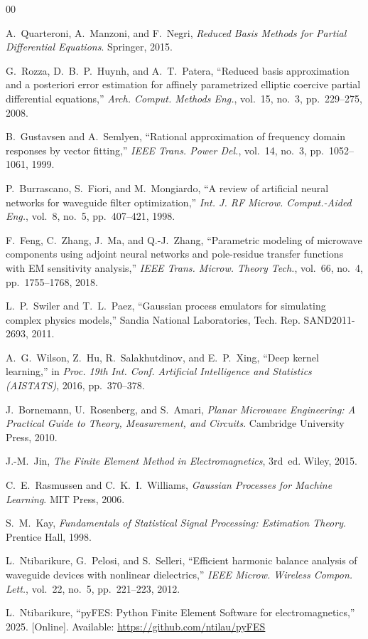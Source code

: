 \documentclass[conference]{IEEEtran}
\begin{document}
\begin{thebibliography}{00}

A.~Quarteroni, A.~Manzoni, and F.~Negri, \textit{Reduced Basis Methods for Partial Differential Equations}. Springer, 2015.

G.~Rozza, D.~B.~P.~Huynh, and A.~T.~Patera, ``Reduced basis approximation and a posteriori error estimation for affinely parametrized elliptic coercive partial differential equations,'' \textit{Arch. Comput. Methods Eng.}, vol.~15, no.~3, pp.~229--275, 2008.

B.~Gustavsen and A.~Semlyen, ``Rational approximation of frequency domain responses by vector fitting,'' \textit{IEEE Trans. Power Del.}, vol.~14, no.~3, pp.~1052--1061, 1999.

P.~Burrascano, S.~Fiori, and M.~Mongiardo, ``A review of artificial neural networks for waveguide filter optimization,'' \textit{Int. J. RF Microw. Comput.-Aided Eng.}, vol.~8, no.~5, pp.~407--421, 1998.

F.~Feng, C.~Zhang, J.~Ma, and Q.-J.~Zhang, ``Parametric modeling of microwave components using adjoint neural networks and pole-residue transfer functions with EM sensitivity analysis,'' \textit{IEEE Trans. Microw. Theory Tech.}, vol.~66, no.~4, pp.~1755--1768, 2018.

L.~P.~Swiler and T.~L.~Paez, ``Gaussian process emulators for simulating complex physics models,'' Sandia National Laboratories, Tech. Rep. SAND2011-2693, 2011.

A.~G.~Wilson, Z.~Hu, R.~Salakhutdinov, and E.~P.~Xing, ``Deep kernel learning,'' in \textit{Proc. 19th Int. Conf. Artificial Intelligence and Statistics (AISTATS)}, 2016, pp.~370--378.

J.~Bornemann, U.~Rosenberg, and S.~Amari, \textit{Planar Microwave Engineering: A Practical Guide to Theory, Measurement, and Circuits}. Cambridge University Press, 2010.

J.-M.~Jin, \textit{The Finite Element Method in Electromagnetics}, 3rd~ed. Wiley, 2015.

C.~E.~Rasmussen and C.~K.~I.~Williams, \textit{Gaussian Processes for Machine Learning}. MIT Press, 2006.

S.~M.~Kay, \textit{Fundamentals of Statistical Signal Processing: Estimation Theory}. Prentice Hall, 1998.

L.~Ntibarikure, G.~Pelosi, and S.~Selleri, ``Efficient harmonic balance analysis of waveguide devices with nonlinear dielectrics,'' \textit{IEEE Microw. Wireless Compon. Lett.}, vol.~22, no.~5, pp.~221--223, 2012.

L.~Ntibarikure, ``pyFES: Python Finite Element Software for electromagnetics,'' 2025. [Online]. Available: \url{https://github.com/ntilau/pyFES}

\end{thebibliography}
\end{document}
